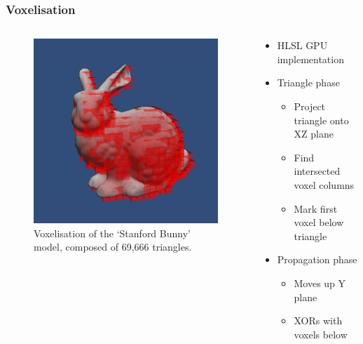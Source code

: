 \documentclass{beamer}
\begin{document}
	\begin{frame}
	\frametitle{Voxelisation}
		\begin{columns}[T] %
			\begin{column}[T]{5cm} %
				\begin{figure}
					\centerline{\includegraphics[scale=0.4]{Voxelise.png}}
					\caption{Voxelisation of the `Stanford Bunny' model, composed of 69,666 triangles.}
				\end{figure}
			\end{column}
			\begin{column}[T]{5cm} %
				\begin{itemize}
				\item{HLSL GPU implementation}
				\item{Triangle phase}
					\begin{itemize}
						\item{Project triangle onto XZ plane}
						\item{Find intersected voxel columns}
						\item{Mark first voxel below triangle}
					\end{itemize}
				\item{Propagation phase}
					\begin{itemize}
						\item{Moves up Y plane}
						\item{XORs with voxels below}
					\end{itemize}
				\end{itemize}
			\end{column}
		\end{columns}
	\end{frame}
\end{document}
